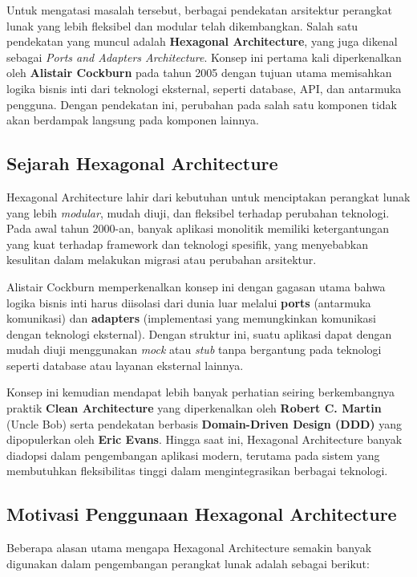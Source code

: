 Untuk mengatasi masalah tersebut, berbagai pendekatan arsitektur perangkat lunak yang lebih fleksibel dan modular telah dikembangkan. Salah satu pendekatan yang muncul adalah \textbf{Hexagonal Architecture}, yang juga dikenal sebagai \textit{Ports and Adapters Architecture}. Konsep ini pertama kali diperkenalkan oleh \textbf{Alistair Cockburn} pada tahun 2005 dengan tujuan utama memisahkan logika bisnis inti dari teknologi eksternal, seperti database, API, dan antarmuka pengguna. Dengan pendekatan ini, perubahan pada salah satu komponen tidak akan berdampak langsung pada komponen lainnya.

\subsection{Sejarah Hexagonal Architecture}

Hexagonal Architecture lahir dari kebutuhan untuk menciptakan perangkat lunak yang lebih \textit{modular}, mudah diuji, dan fleksibel terhadap perubahan teknologi. Pada awal tahun 2000-an, banyak aplikasi monolitik memiliki ketergantungan yang kuat terhadap framework dan teknologi spesifik, yang menyebabkan kesulitan dalam melakukan migrasi atau perubahan arsitektur.

Alistair Cockburn memperkenalkan konsep ini dengan gagasan utama bahwa logika bisnis inti harus diisolasi dari dunia luar melalui \textbf{ports} (antarmuka komunikasi) dan \textbf{adapters} (implementasi yang memungkinkan komunikasi dengan teknologi eksternal). Dengan struktur ini, suatu aplikasi dapat dengan mudah diuji menggunakan \textit{mock} atau \textit{stub} tanpa bergantung pada teknologi seperti database atau layanan eksternal lainnya.

Konsep ini kemudian mendapat lebih banyak perhatian seiring berkembangnya praktik \textbf{Clean Architecture} yang diperkenalkan oleh \textbf{Robert C. Martin} (Uncle Bob) serta pendekatan berbasis \textbf{Domain-Driven Design (DDD)} yang dipopulerkan oleh \textbf{Eric Evans}. Hingga saat ini, Hexagonal Architecture banyak diadopsi dalam pengembangan aplikasi modern, terutama pada sistem yang membutuhkan fleksibilitas tinggi dalam mengintegrasikan berbagai teknologi.

\subsection{Motivasi Penggunaan Hexagonal Architecture}

Beberapa alasan utama mengapa Hexagonal Architecture semakin banyak digunakan dalam pengembangan perangkat lunak adalah sebagai berikut:

